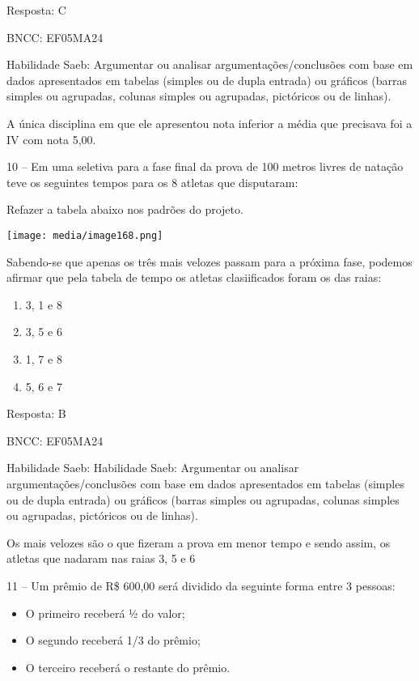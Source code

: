 Resposta: C

BNCC: EF05MA24

Habilidade Saeb: Argumentar ou analisar argumentações/conclusões com
base em dados apresentados em tabelas (simples ou de dupla entrada) ou
gráficos (barras simples ou agrupadas, colunas simples ou agrupadas,
pictóricos ou de linhas).

A única disciplina em que ele apresentou nota inferior a média que
precisava foi a IV com nota 5,00.

10 -- Em uma seletiva para a fase final da prova de 100 metros livres de
natação teve os seguintes tempos para os 8 atletas que disputaram:

Refazer a tabela abaixo nos padrões do projeto.

\texttt{[image: media/image168.png]}

Sabendo-se que apenas os três mais velozes passam para a próxima fase,
podemos afirmar que pela tabela de tempo os atletas clasiificados foram
os das raias:

\begin{enumerate}
\def\labelenumi{\alph{enumi})}
\item
  3, 1 e 8
\item
  3, 5 e 6
\item
  1, 7 e 8
\item
  5, 6 e 7
\end{enumerate}

Resposta: B

BNCC: EF05MA24

Habilidade Saeb: Habilidade Saeb: Argumentar ou analisar
argumentações/conclusões com base em dados apresentados em tabelas
(simples ou de dupla entrada) ou gráficos (barras simples ou agrupadas,
colunas simples ou agrupadas, pictóricos ou de linhas).

Os mais velozes são o que fizeram a prova em menor tempo e sendo assim,
os atletas que nadaram nas raias 3, 5 e 6

11 -- Um prêmio de R\$ 600,00 será dividido da seguinte forma entre 3
pessoas:

\begin{itemize}
\item
  O primeiro receberá ½ do valor;
\item
  O segundo receberá 1/3 do prêmio;
\item
  O terceiro receberá o restante do prêmio.
\end{itemize}

